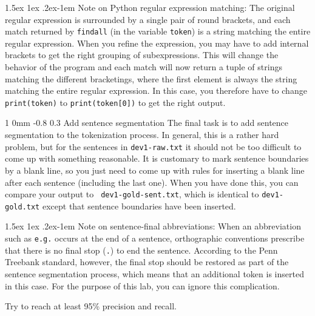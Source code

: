\documentclass[11pt]{article}
\makeatletter
\newcommand{\newsec}[2]{\section{#1}\label{sec:#2}\noindent}
\renewcommand{\section}{\@startsection
{section}%
{1}%
{0mm}%
{-0.8\baselineskip}%
{0.3\baselineskip}%
{\bfseries\large}}%
\renewcommand{\paragraph}{%
  \@startsection{paragraph}{4}%
  {\z@}{1.5ex \@plus 1ex \@minus .2ex}{-1em}%
  {\normalfont\normalsize\bfseries}%
}\makeatother
\makeatother
\begin{document}
\paragraph{Note on Python regular expression matching:} The original
regular expression is surrounded by a single pair of round brackets,
and each match returned by {\tt findall} (in the variable {\tt token})
is a string matching the entire regular expression. When you refine
the expression, you may have to add internal brackets to get the right
grouping of subexpressions. This will change the behavior of the
program and each match will now return a tuple of strings matching the
different bracketings, where the first element is always the string
matching the entire regular expression. In this case, you therefore
have to change {\tt print(token)} to {\tt print(token[0])} to get the
right output.
 
\newsec{Add sentence segmentation }{sent}%
The final task is to add sentence segmentation to the tokenization
process. In general, this is a rather hard problem, but for the
sentences in {\tt dev1-raw.txt} it should not be too difficult to come
up with something reasonable. It is customary to mark sentence
boundaries by a blank line, so you just need to come up with rules for
inserting a blank line after each sentence (including the last
one). When you have done this, you can compare your output to {\tt
  dev1-gold-sent.txt}, which is identical to {\tt dev1-gold.txt}
except that sentence boundaries have been inserted.

\paragraph{Note on sentence-final abbreviations:} When an abbreviation
such as {\tt e.g.} occurs at the end of a sentence, orthographic
conventions prescribe that there is no final stop ({\tt .}) to end the
sentence. According to the Penn Treebank standard, however, the final
stop should be restored as part of the sentence segmentation process,
which means that an additional token is inserted in this case. For the
purpose of this lab, you can ignore this complication.

\indent Try to reach at least 95\% precision and recall.

\end{document}
